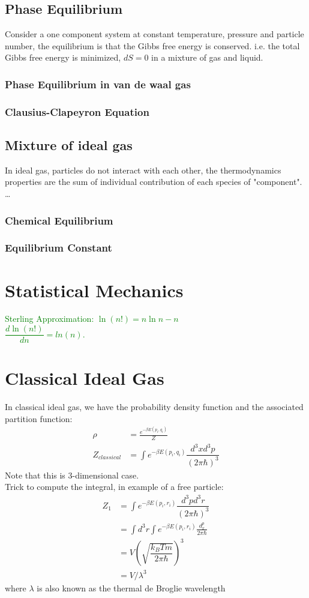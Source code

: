 \documentclass[12pt,a4paper]{article}
\begin{document}
    \subsection {Phase Equilibrium}
    Consider a one component system at constant temperature, pressure and particle number, the equilibrium is that the Gibbs free energy is conserved.
    i.e. the total Gibbs free energy is minimized, $dS =0$ in a mixture of gas and liquid.
    \subsubsection {Phase Equilibrium in van de waal gas}
    \subsubsection {Clausius-Clapeyron Equation}
    \subsection {Mixture of ideal gas}
        In ideal gas, particles do not interact with each other, the thermodynamics properties are the sum of individual contribution of each species of "component".
        \dots
        \subsubsection{Chemical Equilibrium}
        \subsubsection{Equilibrium Constant}
\section{Statistical Mechanics}
    \textcolor{green}{
        Sterling Approximation: $\ln(n!)= n\ln{n} - n $\\
        $\dfrac{d\ln(n!)}{dn} = ln(n)$.
    }
\section{Classical Ideal Gas}
    In classical ideal gas, we have the probability density function and the associated partition function:
    \begin{align*}
        \rho &= \frac{e^{-\beta E({p_i,q_i})}}{Z}\\
        Z_{classical} &= \int e^{-\beta E({p_i,q_i})} \dfrac{d^3x d^3p}{(2\pi\hbar)^3}
    \end{align*}
    Note that this is 3-dimensional case.\\
    Trick to compute the integral, in example of a free particle:
    \begin{align*}
        Z_1 &= \int e^{-\beta E({p_i,r_i})} \dfrac{d^3p d^3r}{(2\pi\hbar)^3}\\
            &= \int d^3r \int e^{-\beta E({p_i,r_i})} \frac{d^p_x}{2\pi\hbar}\\
            &= V(\sqrt{\dfrac{k_BTm}{2\pi\hbar}})^3\\
            &= V/\lambda^3
    \end{align*}
    where $\lambda$ is also known as the thermal de Broglie wavelength 
    
\end{document}
